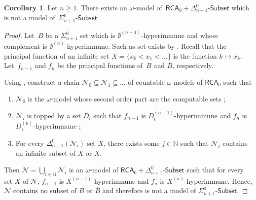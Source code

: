 \documentclass{article}
\def\N{\mathcal{N}}
\def\NN{\mathbb{N}}
\newcommand{\Sub}[1]{{#1}\mbox{-}\mathsf{Subset}}
\newcommand{\RCA}{\mathsf{RCA}}
\numberwithin{theorem}{section}
\theoremstyle{definition}
\newtheorem{corollary}[theorem]{Corollary}
\begin{document}
\begin{corollary}
Let $n \geq 1$. There exists an $\omega$-model of~$\RCA_0 + \Sub{\Delta^0_{n+1}}$ which is not a model of~$\Sub{\Sigma^0_{n+1}}$.
\end{corollary}
\begin{proof}
Let~$B$ be a $\Sigma^0_{n+1}$ set which is $\emptyset^{(n-1)}$-hyperimmune and whose complement is $\emptyset^{(n)}$-hyperimmune. Such as set exists by . Recall that the principal function of an infinite set $X = \{ x_0 < x_1 < \dots \}$ is the function $k \mapsto x_k$. Let~$f_{n-1}$ and $f_n$ be the principal functions of~$B$ and $\overline{B}$, respectively. 

Using , construct a chain $\N_0 \subseteq \N_1 \subseteq \dots$ of countable $\omega$-models of $\RCA_0$ such that 
\begin{enumerate}
    \item $\N_0$ is the $\omega$-model whose second order part are the computable sets ;
    \item $\N_i$ is topped by a set $D_i$ such that $f_{n-1}$ is $D_i^{(n-1)}$-hyperimmune and $f_n$ is $D_i^{(n)}$-hyperimmune ;
    \item For every $\Delta_{n+1}^0(\N_i)$ set $X$, there exists some $j \in \NN$ such that $\N_j$ contains an infinite subset of $X$ or $\overline{X}$.
\end{enumerate}

Then $\N = \bigcup_{i \in \NN} \N_i$ is an $\omega$-model of $\RCA_0 + \Sub{\Delta^0_{n+1}}$ such that for every set $X$ of $\N$, $f_{n-1}$ is $X^{(n-1)}$-hyperimmune and $f_n$ is $X^{(n)}$-hyperimmune. Hence, $\N$ contains no subset of $B$ or $\overline{B}$ and therefore is not a model of $\Sub{\Sigma^0_{n+1}}$.
\end{proof}
\end{document}
